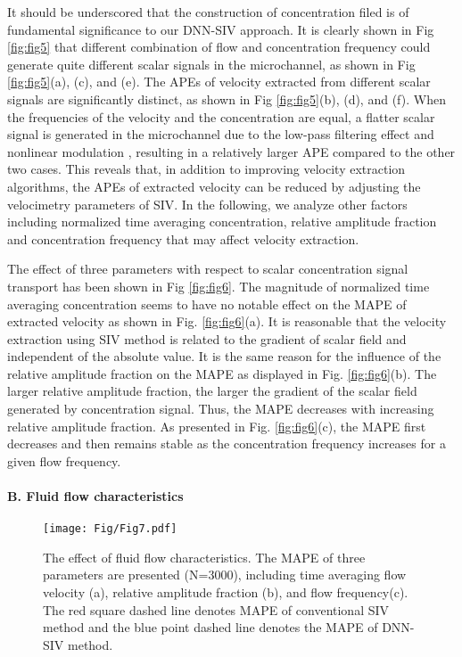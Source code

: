 \documentclass{article}
\begin{document}
It should be underscored that the construction of concentration filed is of fundamental significance to our DNN-SIV approach. It is clearly shown in Fig \ref{fig:fig5} that different combination of flow and concentration frequency could generate quite different scalar signals in the microchannel, as shown in Fig \ref{fig:fig5}(a), (c), and (e). The APEs of velocity extracted from different scalar signals are significantly distinct, as shown in Fig \ref{fig:fig5}(b), (d), and (f). When the frequencies of the velocity and the concentration are equal, a flatter scalar signal is generated in the microchannel due to the low-pass filtering effect and nonlinear modulation \citep{li2018transmission}, resulting in a relatively larger APE compared to the other two cases. This reveals that, in addition to improving velocity extraction algorithms, the APEs of extracted velocity can be reduced by adjusting the velocimetry parameters of SIV. In the following, we analyze other factors including normalized time averaging concentration, relative amplitude fraction and concentration frequency that may affect velocity extraction.\par
The effect of three parameters with respect to scalar concentration signal transport has been shown in Fig \ref{fig:fig6}. The magnitude of normalized time averaging concentration seems to have no notable effect on the MAPE of extracted velocity as shown in Fig. \ref{fig:fig6}(a). It is reasonable that the velocity extraction using SIV method is related to the gradient of scalar field and independent of the absolute value. It is the same reason for the influence of the relative amplitude fraction on the MAPE as displayed in Fig. \ref{fig:fig6}(b). The larger relative amplitude fraction, the larger the gradient of the scalar field generated by concentration signal. Thus, the MAPE decreases with increasing relative amplitude fraction. As presented in Fig. \ref{fig:fig6}(c), the MAPE first decreases and then remains stable as the concentration frequency increases for a given flow frequency.

\paragraph{B. Fluid flow characteristics}
\begin{figure}
	\centering
	\texttt{[image: Fig/Fig7.pdf]}
	\caption{The effect of fluid flow characteristics. The MAPE of three parameters are presented (N=3000), including time averaging flow velocity (a), relative amplitude fraction (b), and flow frequency(c). The red square dashed line denotes MAPE of conventional SIV method and the blue point dashed line denotes the MAPE of DNN-SIV method.}
	\label{fig:fig7}
\end{figure}
\end{document}

